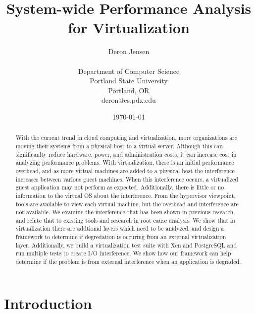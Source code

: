 \documentclass[10pt,onecolumn,oneside]{article}
\begin{document}
\title{System-wide Performance Analysis for Virtualization}
\author{Deron Jensen\\
\\
Department of Computer Science\\
Portland State University\\
Portland, OR \\
deron@cs.pdx.edu \\
}
\date{\today}
  \maketitle

\begin{abstract}
With the current trend in cloud computing and virtualization, more organizations are moving their systems from a physical host to a virtual server.  Although this can significanlty reduce hardware, power, and administration costs, it can increase cost in analyzing performance problems.  With virtualization, there is an initial performance overhead, and as more virtual machines are added to a physical host the interference increases between various guest machines.  When this interference occurs, a virtualized guest application may not perform as expected.  Additionally, there is little or no information to the virtual OS about the interference.  From the hypervisor viewpoint, tools are available to view each virtual machine, but the overhead and interference are not available. \newline
\indent  We examine the interference that has been shown in previous research, and relate that to existing tools and research in root cause analysis.  We show that in virtualization there are addtional layers which need to be analyzed, and design a framework to determine if degredation is occuring from an external virtualization layer.  Additionally, we build a virtualization test suite with Xen and PostgreSQL and run multiple tests to create I/O interference.  We show how our framework can help determine if the problem is from external interference when an application is degraded.   
  \end{abstract}

\onecolumn
\section{Introduction}

\end{document}
